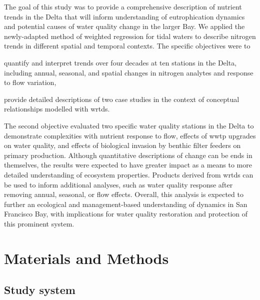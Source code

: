 \documentclass[journal = esthag, manuscript = article]{achemso}\usepackage[]{graphicx}\usepackage[]{color}
\begin{document}
The goal of this study was to provide a comprehensive description of nutrient trends in the Delta that will inform understanding of eutrophication dynamics and potential causes of water quality change in the larger Bay. We applied the newly-adapted method of weighted regression for tidal waters to describe nitrogen trends in  different spatial and temporal contexts. The specific objectives were to \begin{inparaenum}[1\upshape)]  
\item quantify and interpret trends over four decades at ten stations in the Delta, including annual, seasonal, and spatial changes in nitrogen analytes and response to flow variation,
\item provide detailed descriptions of two case studies in the context of conceptual relationships modelled with \ac{wrtds}.
\end{inparaenum}
The second objective evaluated two specific water quality stations in the Delta to demonstrate complexities with nutrient response to flow, effects of \ac{wwtp} upgrades on water quality, and effects of biological invasion by benthic filter feeders on primary production. Although quantitative descriptions of change can be ends in themselves, the results were expected to have greater impact as a means to more detailed understanding of ecosystem properties.  Products derived from \ac{wrtds} can be used to inform additional analyses, such as water quality response after removing annual, seasonal, or flow effects. Overall, this analysis is expected to further an ecological and management-based understanding of dynamics in San Francisco Bay, with implications for water quality restoration and protection of this prominent system. 

\section{Materials and Methods}

\subsection{Study system}
\end{document}
